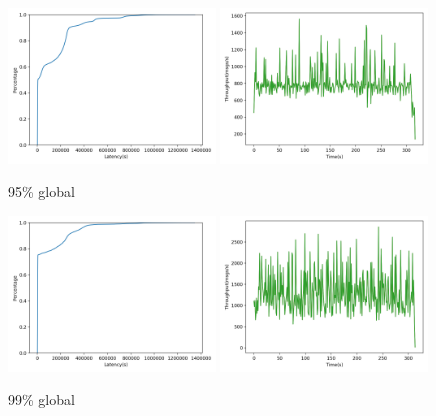 \begin{figure}[!htb]
  \centering
  \includegraphics[width=0.49\textwidth,height=\textheight,keepaspectratio]{img/global5_lat.png}
  \includegraphics[width=0.49\textwidth,height=\textheight,keepaspectratio]{img/global5_tp.png}
  \caption[caption]{ 95\% global }
  \label{fig:global5-performance}
\end{figure}

\begin{figure}[!htb]
  \centering
  \includegraphics[width=0.49\textwidth,height=\textheight,keepaspectratio]{img/global1_lat.png}
  \includegraphics[width=0.49\textwidth,height=\textheight,keepaspectratio]{img/global1_tp.png}
  \caption[caption]{ 99\% global }
  \label{fig:global1-performance}
\end{figure}

